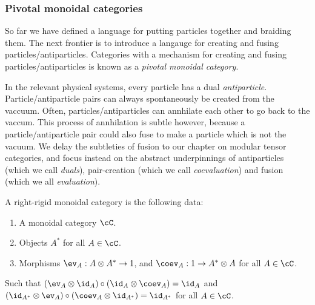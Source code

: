 \subsubsection{Pivotal monoidal categories}

So far we have defined a language for putting particles together and braiding them. The next frontier is to introduce a langauge for creating and fusing particles/antiparticles. Categories with a mechanism for creating and fusing particles/antiparticles is known as a {\em pivotal monoidal category}.

\begin{rem}
In the relevant physical systems, every particle has a dual {\em antiparticle}. Particle/antiparticle pairs can always spontaneously be created from the vaccuum. Often, particles/antiparticles can annhilate each other to go back to the vaccum. This process of annhilation is subtle however, because a particle/antiparticle pair could also fuse to make a particle which is not the vacuum. We delay the subtleties of fusion to our chapter on modular tensor categories, and focus instead on the abstract underpinnings of antiparticles (which we call {\em duals}), pair-creation (which we call {\em coevaluation}) and fusion (which we all {\em evaluation}).
\end{rem}

\begin{ex}\label{pivotal-category-examples}
\end{ex}

\begin{defn} A right-rigid monoidal category is the following data:

\begin{enumerate}
\item A monoidal category $\cC$.
\item Objects $A^*$ for all $A\in \cC$.
\item Morphisms $\ev_{A}: A\otimes A^*\to 1$, and $\coev_{A}: 1\to A^*\otimes A$ for all $A\in \cC$.
\end{enumerate}

Such that $(\ev_A \otimes \id_A)\circ (\id_A\otimes \coev_A)=\id_A$ and $(\id_{A^*}\otimes \ev_A)\circ (\coev_{A}\otimes \id_{A^*})=\id_{A^*}$ for all $A\in \cC$. 


\end{defn}

